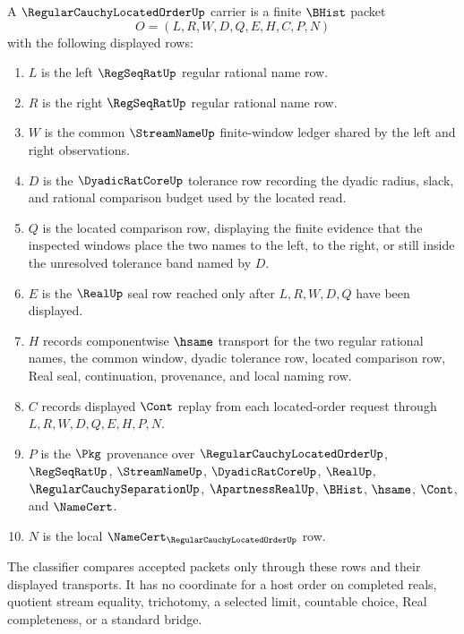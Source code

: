 \begin{definition}
\label{def:regular-cauchy-located-order-carrier}
A $\RegularCauchyLocatedOrderUp$ carrier is a finite $\BHist$ packet
$$
O=(L,R,W,D,Q,E,H,C,P,N)
$$
with the following displayed rows:
\begin{enumerate}
\item $L$ is the left $\RegSeqRatUp$ regular rational name row.
\item $R$ is the right $\RegSeqRatUp$ regular rational name row.
\item $W$ is the common $\StreamNameUp$ finite-window ledger shared by the left and right observations.
\item $D$ is the $\DyadicRatCoreUp$ tolerance row recording the dyadic radius, slack, and rational comparison budget used by the located read.
\item $Q$ is the located comparison row, displaying the finite evidence that the inspected windows place the two names to the left, to the right, or still inside the unresolved tolerance band named by $D$.
\item $E$ is the $\RealUp$ seal row reached only after $L,R,W,D,Q$ have been displayed.
\item $H$ records componentwise $\hsame$ transport for the two regular rational names, the common window, dyadic tolerance row, located comparison row, Real seal, continuation, provenance, and local naming row.
\item $C$ records displayed $\Cont$ replay from each located-order request through $L,R,W,D,Q,E,H,P,N$.
\item $P$ is the $\Pkg$ provenance over $\RegularCauchyLocatedOrderUp$, $\RegSeqRatUp$, $\StreamNameUp$, $\DyadicRatCoreUp$, $\RealUp$, $\RegularCauchySeparationUp$, $\ApartnessRealUp$, $\BHist$, $\hsame$, $\Cont$, and $\NameCert$.
\item $N$ is the local $\NameCert_{\RegularCauchyLocatedOrderUp}$ row.
\end{enumerate}
The classifier compares accepted packets only through these rows and their displayed transports. It has no coordinate for a host order on completed reals, quotient stream equality, trichotomy, a selected limit, countable choice, Real completeness, or a standard bridge.
\end{definition}

